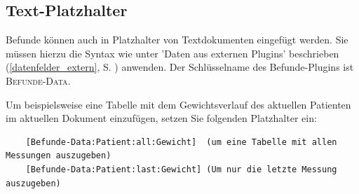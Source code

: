 \subsection{Text-Platzhalter}
 
Befunde können auch in Platzhalter von Textdokumenten eingefügt werden. Sie müssen hierzu die Syntax wie unter 'Daten aus externen Plugins' beschrieben (\ref{datenfelder_extern}, S. \pageref{datenfelder_extern}) anwenden. Der Schlüsselname des Befunde-Plugins ist \textsc{Befunde-Data}.

Um beispielsweise eine Tabelle mit dem Gewichtsverlauf des aktuellen Patienten im aktuellen Dokument einzufügen, setzen Sie folgenden Platzhalter ein:
\begin{verbatim}
    [Befunde-Data:Patient:all:Gewicht]  (um eine Tabelle mit allen Messungen auszugeben)
    [Befunde-Data:Patient:last:Gewicht] (Um nur die letzte Messung auszugeben)
\end{verbatim}
 